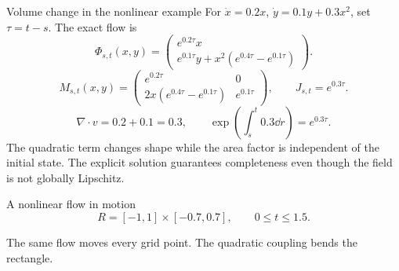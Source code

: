 \begin{frame}[t]{Volume change in the nonlinear example}
\hypertarget{main:nonlinear-jacobian}{}
For $\dot x=0.2x$, $\dot y=0.1y+0.3x^2$, set $\tau=t-s$. The exact flow is
\begin{equation*}
  \Phi_{s,t}(x,y)=
  \begin{pmatrix}e^{0.2\tau}x\\ e^{0.1\tau}y+x^2(e^{0.4\tau}-e^{0.1\tau})\end{pmatrix}.
\end{equation*}
\begin{equation*}
  M_{s,t}(x,y)=
  \begin{pmatrix}
    e^{0.2\tau}&0\\
    2x(e^{0.4\tau}-e^{0.1\tau})&e^{0.1\tau}
  \end{pmatrix},\qquad J_{s,t}=e^{0.3\tau}.
\end{equation*}
\begin{equation*}
  \nabla\cdot v=0.2+0.1=0.3,\qquad
  \exp\!\left(\int_s^t0.3\dd r\right)=e^{0.3\tau}.
\end{equation*}
The quadratic term changes shape while the area factor is independent of the initial state.
The explicit solution guarantees completeness even though the field is not globally Lipschitz.
\end{frame}

\begin{frame}[t]{A nonlinear flow in motion}
\hypertarget{main:animation}{}
\begin{equation*}
  R=[-1,1]\times[-0.7,0.7],\qquad 0\leq t\leq1.5.
\end{equation*}
\begin{center}
\end{center}
\smallskip
The same flow moves every grid point. The quadratic coupling bends the rectangle.
\end{frame}

